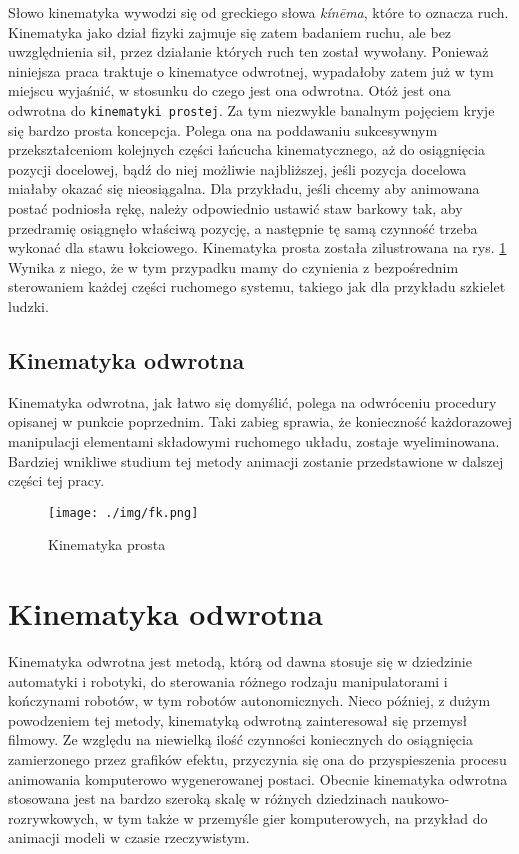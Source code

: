 \documentclass[11pt]{mwrep}
\begin{document}
  Słowo kinematyka wywodzi się od greckiego słowa \textit{kín\={e}ma}, które to oznacza ruch. Kinematyka jako dział fizyki zajmuje się zatem badaniem ruchu, ale bez uwzględnienia sił, przez działanie których ruch ten został wywołany. Ponieważ niniejsza praca traktuje o kinematyce odwrotnej, wypadałoby zatem już w tym miejscu wyjaśnić, w stosunku do czego jest ona odwrotna. Otóż jest ona odwrotna do \texttt{kinematyki prostej}. Za tym niezwykle banalnym pojęciem kryje się bardzo prosta koncepcja. Polega ona na poddawaniu sukcesywnym przekształceniom kolejnych części łańcucha kinematycznego, aż do osiągnięcia pozycji docelowej, bądź do niej możliwie najbliższej, jeśli pozycja docelowa miałaby okazać się nieosiągalna. Dla przykładu, jeśli chcemy aby animowana postać podniosła rękę, należy odpowiednio ustawić staw barkowy tak, aby przedramię osiągnęło właściwą pozycję, a następnie tę samą czynność trzeba wykonać dla stawu łokciowego. Kinematyka prosta została zilustrowana na rys. \ref{img:fk} Wynika z niego, że w tym przypadku mamy do czynienia z bezpośrednim sterowaniem każdej części ruchomego systemu, takiego jak dla przykładu szkielet ludzki.

  \section{Kinematyka odwrotna}

  Kinematyka odwrotna, jak łatwo się domyślić, polega na odwróceniu procedury opisanej w punkcie poprzednim. Taki zabieg sprawia, że konieczność każdorazowej manipulacji elementami składowymi ruchomego układu, zostaje wyeliminowana. Bardziej wnikliwe studium tej metody animacji zostanie przedstawione w dalszej części tej pracy.

\vspace{15ex}

  \begin{figure}[h!]
  \centering
    \texttt{[image: ./img/fk.png]}
  \caption{Kinematyka prosta}
  \label{img:fk}
  \end{figure}

  
\chapter{Kinematyka odwrotna}

Kinematyka odwrotna jest metodą, którą od dawna stosuje się w dziedzinie automatyki i robotyki, do sterowania różnego rodzaju manipulatorami i kończynami robotów, w tym robotów autonomicznych. Nieco później, z dużym powodzeniem tej metody, kinematyką odwrotną zainteresował się przemysł filmowy. Ze względu na niewielką ilość czynności koniecznych do osiągnięcia zamierzonego przez grafików efektu, przyczynia się ona do przyspieszenia procesu animowania komputerowo wygenerowanej postaci. Obecnie kinematyka odwrotna stosowana jest na bardzo szeroką skalę w różnych dziedzinach naukowo-rozrywkowych, w tym także w przemyśle gier komputerowych, na przykład do animacji modeli w czasie rzeczywistym.
\end{document}

